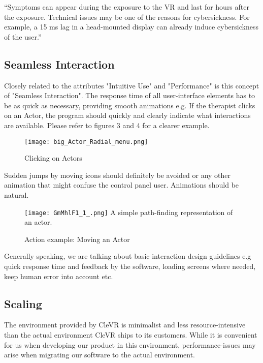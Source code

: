 \documentclass[11pt]{article}
\begin{document}
“Symptoms can appear during the exposure to the VR and last for hours after the exposure. Technical issues may be one of the reasons for cybersickness. For example, a 15 ms lag in a head-mounted display can already induce cybersickness of the user.”\cite{nausea}
    
    \subsection{Seamless Interaction}
    Closely related to the attributes "Intuitive Use" and "Performance" is this concept of "Seamless Interaction". The response time of all user-interface elements has to be as quick as necessary, providing smooth animations e.g. If the therapist clicks on an Actor, the program should quickly and clearly indicate what interactions are available. Please refer to figures 3 and 4 for a clearer example.
\begin{figure}[h]
	\caption{Clicking on Actors}
	\texttt{[image: big\_Actor\_Radial\_menu.png]}
    
\end{figure}
\newpage
\noindent
Sudden jumps by moving icons should definitely be avoided or any other animation that might confuse the control panel user. Animations should be natural.
    \begin{figure}[h]
    	\caption{Action example: Moving an Actor}
		\texttt{[image: GmMhlF1\_1\_.png]}
        A simple path-finding representation of an actor.
     \end{figure}
\newline
Generally speaking, we are talking about basic interaction design guidelines e.g quick response time and feedback by the software, loading screens where needed, keep human error into account etc. 
    
    
    
    \subsection{Scaling}
     The environment provided by CleVR is minimalist and less resource-intensive than the actual environment CleVR ships to its customers. While it is convenient for us when developing our product in this environment, performance-issues may arise when migrating our software to the actual environment.
    
\end{document}
